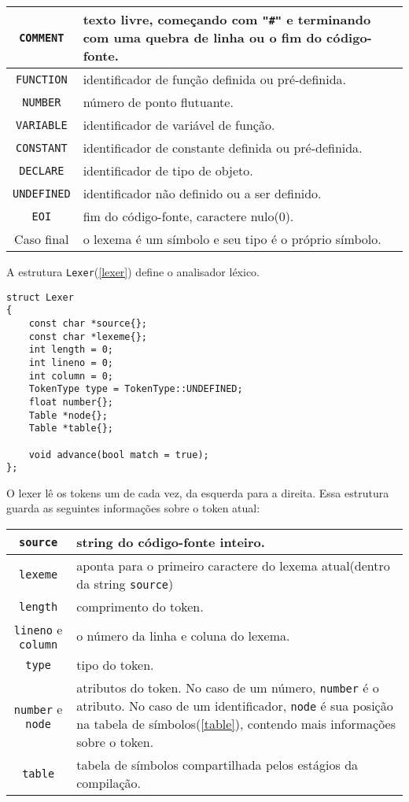 \begin{centering}
\begin{tabularx}{\textwidth}{||c|X||}
\hline \texttt{COMMENT} & texto livre, começando com \texttt{"\#"} e
terminando com uma quebra de linha ou o fim do código-fonte.\\ 
\hline \texttt{FUNCTION} & identificador de função definida ou pré-definida.\\
\hline \texttt{NUMBER} & número de ponto flutuante.\\
\hline \texttt{VARIABLE} & identificador de variável de função.\\
\hline \texttt{CONSTANT} &identificador de constante definida ou pré-definida.\\
\hline \texttt{DECLARE} & identificador de tipo de objeto.\\
\hline \texttt{UNDEFINED} & identificador não definido ou a ser definido.\\
\hline \texttt{EOI} & fim do código-fonte, caractere nulo(0).\\
\hline Caso final & o lexema é um símbolo e seu tipo é o próprio símbolo.\\
\hline
\end{tabularx}
\end{centering}

A estrutura \texttt{Lexer}(\ref{lexer}) define o analisador léxico.
\begin{lstlisting}[label=lexer, caption=Extrutura do Lexer]
struct Lexer
{
    const char *source{};
    const char *lexeme{};
    int length = 0;
    int lineno = 0;
    int column = 0;
    TokenType type = TokenType::UNDEFINED;
    float number{};
    Table *node{};
    Table *table{};

    void advance(bool match = true);
};
\end{lstlisting}

O lexer lê os tokens um de cada vez, da esquerda para a direita.
Essa estrutura guarda as seguintes informações sobre o token atual:

\begin{centering}
\begin{tabularx}{\textwidth}{||c|X||}
\hline \texttt{source} & string do código-fonte inteiro. \\
\hline \texttt{lexeme} & aponta para o primeiro caractere do lexema atual(dentro da string \texttt{source}) \\
\hline \texttt{length} & comprimento do token. \\
\hline \texttt{lineno} e \texttt{column} & o número da linha e coluna do lexema. \\
\hline \texttt{type} & tipo do token. \\
\hline \texttt{number} e \texttt{node} & atributos do token.
No caso de um número, \texttt{number} é o atributo.
No caso de um identificador, \texttt{node} é sua posição na tabela de símbolos(\ref{table}),
contendo mais informações sobre o token. \\
\hline \texttt{table} & tabela de símbolos compartilhada pelos estágios da compilação. \\
\hline
\end{tabularx}
\end{centering}

